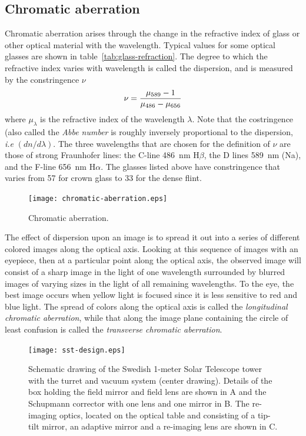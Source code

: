 \subsection{Chromatic aberration}

Chromatic aberration arises through the change in the refractive index of
glass or other optical material with the wavelength. Typical values for
some optical glasses are shown in table~\ref{tab:glass-refraction}. The 
degree to which the refractive index varies with wavelength is called the 
dispersion, and is measured by the constringence $\nu$
\begin{equation}
\nu={\mu_{589}-1\over\mu_{486}-\mu_{656}}\label{eq:costringence}
\end{equation}
where $\mu_\lambda$ is the refractive index of the wavelength $\lambda$. Note
that the costringence (also called the {\it Abbe number} is roughly inversely 
proportional to the dispersion, {\it i.e} $({dn/d\lambda})$.  The
three wavelengths that are chosen for the definition of $\nu$ are those
of strong Fraunhofer lines: the C-line 486~nm H$\beta$, the D lines 589~nm (Na), 
and the F-line 656~nm H$\alpha$. The glasses listed above have constringence that 
varies from 57 for crown glass to 33 for the dense flint. 

\begin{figure}[th!]
 \centering
 \texttt{[image: chromatic-aberration.eps]}
  \caption{Chromatic aberration.}
  \label{fig:chromatic-aberration}
\end{figure}

The effect of dispersion upon an image is to spread it out into a series of
different colored images along the optical axis. Looking at this sequence of
 images with an eyepiece, then at a particular point along the optical axis, the
observed image will consist of a sharp image in the light of one wavelength
surrounded by blurred images of varying sizes in the light of all remaining 
wavelengths. To the eye, the best image occurs when yellow light is focused 
since it is less sensitive to red and blue light.
The spread of colors along the optical axis is called the
{\it longitudinal chromatic aberration}, while that along the image plane
containing the circle of least confusion is called the {\it transverse
chromatic aberration}.

\begin{figure}[th!]
	\centering
	\texttt{[image: sst-design.eps]}
  \caption{Schematic drawing of the Swedish 1-meter Solar Telescope tower 
with the turret and vacuum system (center drawing). Details of the box 
holding the field mirror and field lens are shown in A and the Schupmann 
corrector with one lens and one mirror in B. The re-imaging optics, located on
the optical table and consisting of a tip-tilt mirror, an adaptive mirror 
and a re-imaging lens are shown in C.}
  \label{fig:sst-design}
\end{figure}

